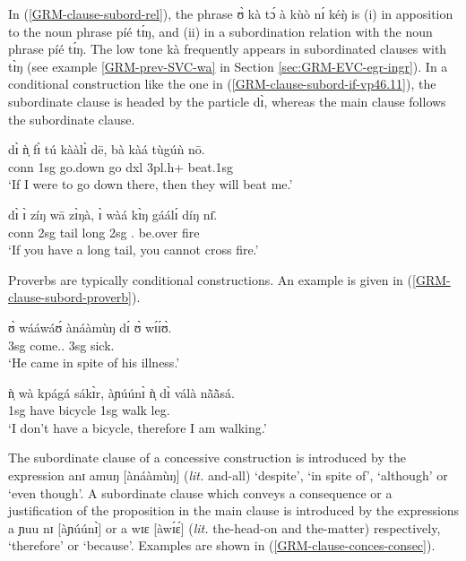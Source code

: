 In (\ref{GRM-clause-subord-rel}), the phrase {\sls ʊ̀ kà tɔ́ à kùò nɪ́ kéŋ̀} is (i) in apposition to the noun phrase {\sls píé tɪ́ŋ}, and (ii) in a subordination relation with the noun phrase {\sls píé tɪ́ŋ}. The low tone {\sls kà} frequently appears in  subordinated clauses with {\sls tɪ̀ŋ}  (see example \ref{GRM-prev-SVC-wa} in Section \ref{sec:GRM-EVC-egr-ingr}). In a conditional construction like the one in (\ref{GRM-clause-subord-if-vp46.11}), the subordinate clause is headed by the particle {\sls dɪ̀},  whereas the main clause follows the subordinate clause. 

\ea\label{GRM-clause-subord-di}
\ea\label{GRM-clause-subord-if-vp46.11}

\gll dɪ̀ ǹ̩ fɪ̀ tú kààlɪ̀ dē, bà kàá  tùgúǹ nō.\\
   {\sc conn}  {\sc 1sg} {\mod} {go.down} go {\sc dxl} {\sc 3pl.h+} {\fut}
beat.{\sc 1sg} {\foc}\\
\glt  `If I were to go down there, then they will beat me.' 

\ex\label{GRM-clause-subord-proverb}
\gll dɪ̀ ɪ̀ zíŋ wā zɪ̀ŋà,  ɪ̀ wàá kɪ̀ŋ gáálɪ́ díŋ nɪ̄.\\
  {\sc conn} {\sc 2sg}  tail {\ingr} long  {\sc 2sg} {\neg.\fut} {\abi} be.over fire {\postp}\\
\glt   `If you have a long tail, you cannot cross fire.'

 \z 
 \z
 
 Proverbs are typically  conditional constructions.  An example is given in (\ref{GRM-clause-subord-proverb}).
 
 \ea\label{GRM-clause-conces-consec}

\ea\label{GRM-clause-conces}

\gll ʊ̀ wááwáʊ́ {ànáàmùŋ} dɪ́ ʊ̀ wɪ́ɪ́ʊ̀.\\
    {\sc 3sg} come.{\pfv.\foc} {\conn} {\comp}  {\sc 3sg} sick.{\foc}\\
\glt  `He came in spite of his illness.' 


\ex\label{GRM-clause-consec-1}

\gll ǹ̩ wà kpágá sákɪ̀r, {àɲúúnɪ̀} ǹ̩ dɪ̀ válà nã̀ã̀sá.\\
{\sc 1sg} {\neg} have bicycle {\conn} {\sc 1sg}   {\ipfv} walk
leg.{\pl}\\
\glt `I don't have a bicycle, therefore I am walking.'

 \z 
 \z
 
 The subordinate clause of a concessive construction is introduced by the expression  {\sls anɪ amuŋ} [{\sls ànáàmùŋ}] ({\it lit.} and-all) `despite',  `in spite of', `although' or `even though'. A subordinate clause  which conveys a consequence or a justification of the proposition in the main clause  is introduced by the expressions {\sls a ɲuu nɪ}  [{\sls àɲúúnɪ̀}] or {\sls a wɪɛ} [{\sls àwɪ́ɛ́}] ({\it lit.} the-head-on and  the-matter)  respectively,  `therefore' or `because'. Examples are shown in (\ref{GRM-clause-conces-consec}).


